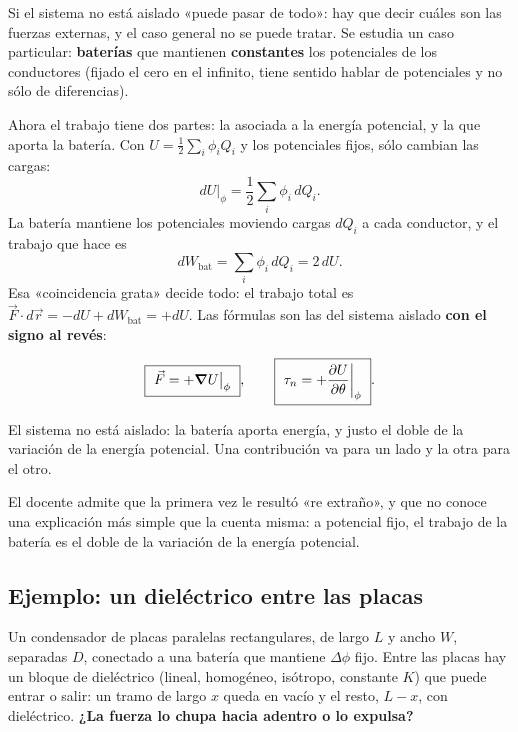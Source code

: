 \documentclass[12pt,a4paper]{article}
\begin{document}
Si el sistema no está aislado «puede pasar de todo»: hay que decir cuáles son las
fuerzas externas, y el caso general no se puede tratar. Se estudia un caso
particular: \textbf{baterías} que mantienen \textbf{constantes} los potenciales de
los conductores (fijado el cero en el infinito, tiene sentido hablar de
potenciales y no sólo de diferencias).

Ahora el trabajo tiene dos partes: la asociada a la energía potencial, y la que
aporta la batería. Con $U = \tfrac12\sum_i\phi_i Q_i$ y los potenciales fijos,
sólo cambian las cargas:
\[
dU\big|_{\phi} = \frac12\sum_i \phi_i\,dQ_i .
\]
La batería mantiene los potenciales moviendo cargas $dQ_i$ a cada conductor, y el
trabajo que hace es
\[
dW_{\text{bat}} = \sum_i \phi_i\,dQ_i = 2\,dU .
\]
Esa «coincidencia grata» decide todo: el trabajo total es
$\vec F\cdot d\vec r = -dU + dW_{\text{bat}} = +dU$. Las fórmulas son las del
sistema aislado \textbf{con el signo al revés}:

\begin{keybox}
\[
\boxed{\ \vec F = +\grad U\big|_{\phi}\ },
\qquad
\boxed{\ \tau_n = +\pdv{U}{\theta}\bigg|_{\phi}\ } .
\]
\end{keybox}

\begin{warnbox}
El sistema no está aislado: la batería aporta energía, y justo el doble de la
variación de la energía potencial. Una contribución va para un lado y la otra
para el otro.
\end{warnbox}

\begin{notebox}
El docente admite que la primera vez le resultó «re extraño», y que no conoce una
explicación más simple que la cuenta misma: a potencial fijo, el trabajo de la
batería es el doble de la variación de la energía potencial.
\end{notebox}

\subsection{Ejemplo: un dieléctrico entre las placas}

Un condensador de placas paralelas rectangulares, de largo $L$ y ancho $W$,
separadas $D$, conectado a una batería que mantiene $\Delta\phi$ fijo. Entre las
placas hay un bloque de dieléctrico (lineal, homogéneo, isótropo, constante $K$)
que puede entrar o salir: un tramo de largo $x$ queda en vacío y el resto,
$L-x$, con dieléctrico. \textbf{¿La fuerza lo chupa hacia adentro o lo expulsa?}
\end{document}
